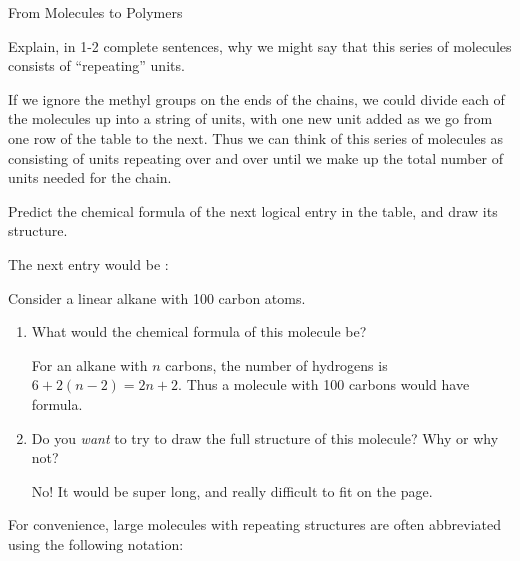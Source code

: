 \begin{activity}{From Molecules to Polymers}
\begin{ctqs}
	\question Explain, in 1-2 complete sentences, why we might say that this series of molecules consists of ``repeating''  units.
			
				\begin{solution}[1.5in]
					If we ignore the methyl groups on the ends of the chains, we could divide each of the molecules up into a string of  units, with one new unit added as we go from one row of the table to the next.  Thus we can think of this series of molecules as consisting of  units repeating over and over until we make up the total number of units needed for the chain.
				\end{solution}
				
		
	\question Predict the chemical formula of the next logical entry in the table, and draw its structure.
			
				\begin{solution}[1in]
					The next entry would be :
					
				\end{solution}
		
	\question Consider a linear alkane with 100 carbon atoms. \label{\labelbase:ctq:100Calkane}
		\begin{enumerate}
			
			\item What would the chemical formula of this molecule be?
			
				\begin{solution}[1in]
					For an alkane with $n$ carbons, the number of hydrogens is $6+2(n-2) = 2n+2$.  Thus a molecule with 100 carbons would have formula.
				\end{solution}
			
			\item Do you \emph{want} to try to draw the full structure of this molecule?  Why or why not?
			
				\begin{solution}[1.25in]
					No!  It would be super long, and really difficult to fit on the page.
				\end{solution}
		\end{enumerate}
\end{ctqs}

\begin{infobox}
	For convenience, large molecules with repeating structures are often abbreviated using the following notation:
	

\end{infobox}
\end{activity}
